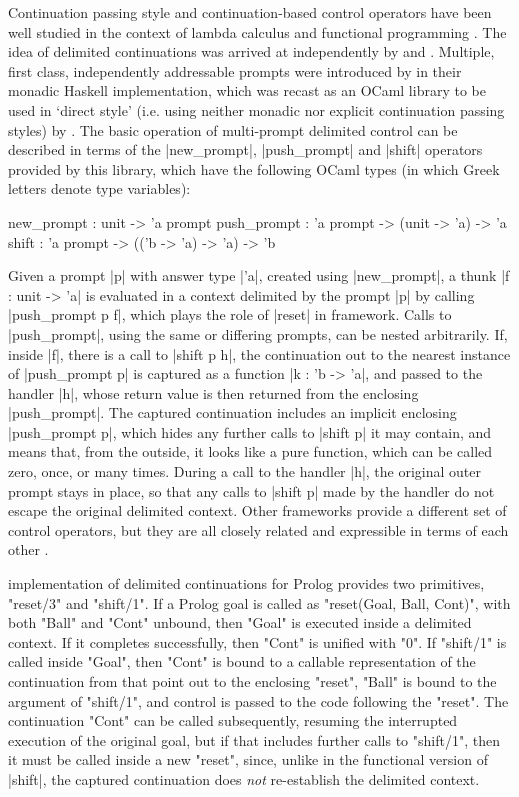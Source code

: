 Continuation passing style and continuation-based control operators have been well studied in the
context of lambda calculus and functional programming \citep{SussmanSteele1975}.
The idea of delimited continuations was arrived at independently by \cite{Felleisen1988} and
\cite{DanvyFilinski1990}. Multiple, first class, independently addressable prompts were introduced
by \cite{DyvbigJonesSabry2005} in their monadic Haskell implementation, which was recast
as an OCaml library to be used in `direct style' (i.e. using neither monadic nor explicit continuation 
passing styles) by \cite{Kiselyov2012}. The basic operation of multi-prompt delimited
control can be described in terms of the |new_prompt|, |push_prompt| and |shift| operators provided by
this library, which have the following OCaml types (in which Greek letters denote type variables):
\begin{ocamlet}
	new_prompt	: unit -> 'a prompt
	push_prompt	: 'a prompt -> (unit -> 'a) -> 'a
	shift        : 'a prompt -> (('b -> 'a) -> 'a) -> 'b
\end{ocamlet}
Given a prompt |p| with answer type |'a|, created using |new_prompt|, a thunk |f : unit -> 'a| is evaluated
in a context delimited by the prompt |p| by calling |push_prompt p f|, which plays the role of |reset| in 
 framework.
Calls to |push_prompt|, using the same or differing prompts, can be nested arbitrarily.
If, inside |f|, there is a call to |shift p h|, the
continuation out to the nearest instance of |push_prompt p| is captured as a function |k : 'b -> 'a|, and passed to the handler
|h|, whose return value is then returned from the enclosing |push_prompt|. The captured continuation includes an implicit
enclosing |push_prompt p|, which hides any further calls to |shift p| it may contain, and means that, from the outside,
it looks like a pure function, which can be called zero, once, or many times. During a call to the handler |h|,
the original outer prompt stays in place, so that any calls to |shift p| made by the handler do not
escape the original delimited context. Other frameworks provide a different set of control operators, but
they are all closely related and expressible in terms of each other \citep{Shan2004}.

 implementation of delimited continuations for Prolog provides two
primitives, "reset/3" and "shift/1". If a Prolog goal is called as "reset(Goal, Ball, Cont)", with both
"Ball" and "Cont" unbound, then "Goal" is executed inside a delimited context. If it completes
successfully, then "Cont" is unified with "0".  If "shift/1" is called inside "Goal", then "Cont" is bound
to a callable representation of the continuation from that point out to the enclosing "reset", "Ball"
is bound to the argument of "shift/1", and control is passed to the code following the "reset".
The continuation "Cont" can be called subsequently, resuming the interrupted execution of the original
goal, but if that includes further calls to "shift/1", then it must be called inside a new
"reset", since, unlike in the functional version of |shift|, the captured continuation 
does \emph{not} re-establish the delimited context.

